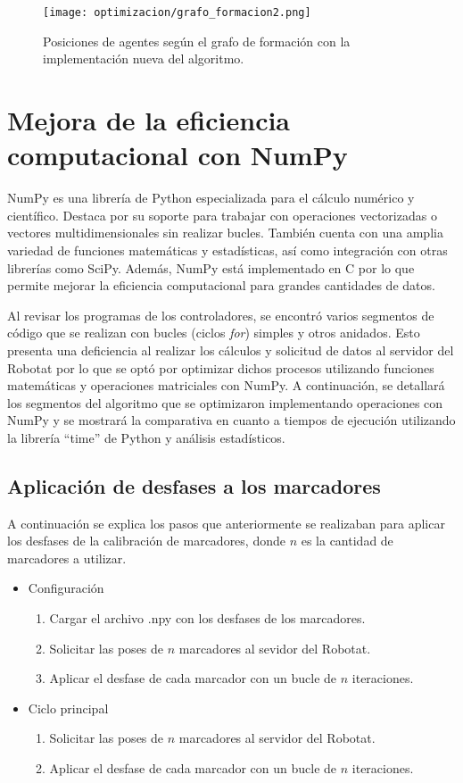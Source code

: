 \begin{figure}[H]
	\centering
	\texttt{[image: optimizacion/grafo\_formacion2.png]}
	\caption{Posiciones de agentes según el grafo de formación con la implementación nueva del algoritmo.}
	\label{fig:grafo_formacion2}
\end{figure}
	
\section{Mejora de la eficiencia computacional con NumPy}
NumPy es una librería de Python especializada para el cálculo numérico y científico. Destaca por su soporte para trabajar con operaciones vectorizadas o vectores multidimensionales sin realizar bucles. También cuenta con una amplia variedad de funciones matemáticas y estadísticas, así como integración con otras librerías como SciPy. Además, NumPy está implementado en C por lo que permite mejorar la eficiencia computacional para grandes cantidades de datos.

Al revisar los programas de los controladores, se encontró varios segmentos de código que se realizan con bucles (ciclos \textit{for}) simples y otros anidados. Esto presenta una deficiencia al realizar los cálculos y solicitud de datos al servidor del Robotat por lo que se optó por optimizar dichos procesos utilizando funciones matemáticas y operaciones matriciales con NumPy. A continuación, se detallará los segmentos del algoritmo que se optimizaron implementando operaciones con NumPy y se mostrará la comparativa en cuanto a tiempos de ejecución utilizando la librería ``time'' de Python y análisis estadísticos.

\subsection{Aplicación de desfases a los marcadores}
A continuación se explica los pasos que anteriormente se realizaban para aplicar los desfases de la calibración de marcadores, donde $n$ es la cantidad de marcadores a utilizar.

\begin{itemize}
	\item Configuración
	\begin{enumerate}
		\item Cargar el archivo .npy con los desfases de los marcadores.
		\item Solicitar las poses de $n$ marcadores al sevidor del Robotat.
		\item Aplicar el desfase de cada marcador con un bucle de $n$ iteraciones.
	\end{enumerate}
	\item Ciclo principal 
	\begin{enumerate}
		\item Solicitar las poses de $n$ marcadores al servidor del Robotat.
		\item Aplicar el desfase de cada marcador con un bucle de $n$ iteraciones.
	\end{enumerate}
\end{itemize}

